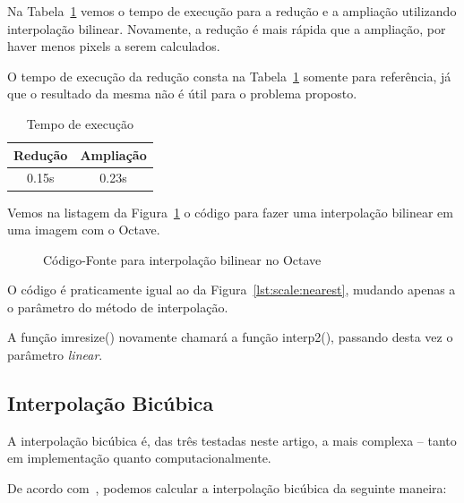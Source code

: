 \documentclass[12pt]{article}
\begin{document}
Na Tabela~\ref{tab:bilinear} vemos o tempo de execução para a redução e a ampliação utilizando interpolação bilinear. Novamente, a redução é mais rápida que a ampliação, por haver menos pixels a serem calculados.

O tempo de execução da redução consta na Tabela~\ref{tab:bilinear} somente para referência, já que o resultado da mesma não é útil para o problema proposto.

\begin{table}[H]
    \caption{Tempo de execução}
    \centering
    \label{tab:bilinear}
    \begin{tabular}{c||c}
     Redução & Ampliação \\
     \hline
     0.15s & 0.23s
    \end{tabular}
\end{table}

Vemos na listagem da Figura~\ref{lst:scale:linear} o código para fazer uma interpolação bilinear em uma imagem com o Octave.

\begin{figure}[H]

\caption{Código-Fonte para interpolação bilinear no Octave}
\label{lst:scale:linear}
\end{figure}

O código é praticamente igual ao da Figura~\ref{lst:scale:nearest}, mudando apenas a o parâmetro do método de interpolação.

A função \textsf{imresize()} novamente chamará a função \textsf{interp2()}, passando desta vez o parâmetro \emph{linear}.


\subsection{Interpolação Bicúbica}\label{sec:redimensionamento:bicubica}

A interpolação bicúbica é, das três testadas neste artigo, a mais complexa -- tanto em implementação quanto computacionalmente.~\cite{han2013}

De acordo com~\cite{han2013}, podemos calcular a interpolação bicúbica da seguinte maneira:
\end{document}
